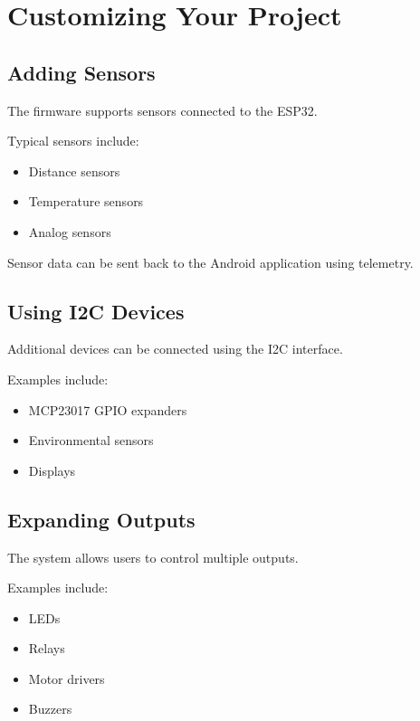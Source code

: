 \chapter{Customizing Your Project}

\section{Adding Sensors}

The firmware supports sensors connected to the ESP32.

Typical sensors include:

\begin{itemize}
	\item Distance sensors
	\item Temperature sensors
	\item Analog sensors
\end{itemize}

Sensor data can be sent back to the Android application using telemetry.

\section{Using I2C Devices}

Additional devices can be connected using the I2C interface.

Examples include:

\begin{itemize}
	\item MCP23017 GPIO expanders
	\item Environmental sensors
	\item Displays
\end{itemize}

\section{Expanding Outputs}

The system allows users to control multiple outputs.

Examples include:

\begin{itemize}
	\item LEDs
	\item Relays
	\item Motor drivers
	\item Buzzers
\end{itemize}